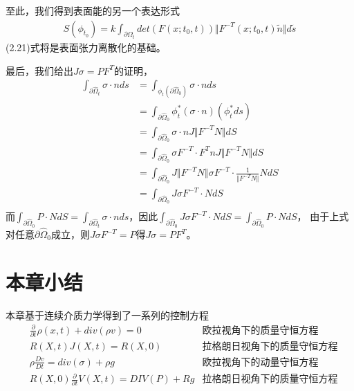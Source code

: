 至此，我们得到表面能的另一个表达形式
\begin{equation}
    \begin{split}
        S(\phi_{t_0}) = k \int_{\partial \Omega_t} det(F(x;t_0,t)) \Vert F^{-T}(x;t_0,t)\tilde{n}\Vert d\tilde{s}
    \end{split}
\end{equation}
(2.21)式将是表面张力离散化的基础。

最后，我们给出$J\sigma = PF^{T}$的证明，
\begin{align*}
    \int_{\partial \hat{\Omega}_{t}} \sigma \cdot n ds &= \int_{\phi_t (\partial \hat{\Omega}_{0})} \sigma\cdot n ds\\
    &= \int_{\partial \hat{\Omega}_0} \phi_t^*(\sigma\cdot n) (\phi_t^* ds)\\
    &= \int_{\partial \hat{\Omega}_0} \sigma\cdot n J \Vert F^{-T} N\Vert dS\\
    &= \int_{\partial \hat{\Omega}_0} \sigma F^{-T} \cdot F^{T}n J \Vert F^{-T} N\Vert dS\\
    &= \int_{\partial \hat{\Omega}_0} J\Vert F^{-T} N\Vert\sigma F^{-T} \cdot \frac{1}{\Vert F^{-T}N \Vert} N dS\\
    &= \int_{\partial \hat{\Omega}_0} J\sigma F^{-T} \cdot　N dS\\
\end{align*}
而$\int_{\partial \hat{\Omega}_{0}} P \cdot N dS = \int_{\partial \hat{\Omega}_{t}} \sigma \cdot n ds$，因此$\int_{\partial \hat{\Omega}_0} J\sigma F^{-T} \cdot　N dS = \int_{\partial \hat{\Omega}_0} P \cdot　N dS$，
由于上式对任意$\partial \hat{\Omega}_0$成立，则$J\sigma F^{-T}= P$得$J\sigma = PF^{T}$。


\section{本章小结}
本章基于连续介质力学得到了一系列的控制方程
\begin{align*}
    &\frac{\partial}{\partial t}\rho (x,t) + div(\rho v) = 0 & \text{欧拉视角下的质量守恒方程} \\
    &R(X,t)J(X,t) = R(X,0) & \text{拉格朗日视角下的质量守恒方程} \\
    &\rho \frac{Dv}{Dt} = div(\sigma) + \rho g & \text{欧拉视角下的动量守恒方程}\\
    &R(X,0)\frac{\partial}{\partial t} V(X,t) = DIV(P) + Rg &\text{拉格朗日视角下的质量守恒方程}
\end{align*}

